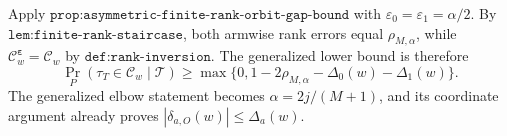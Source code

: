 Apply \(\texttt{prop:asymmetric-finite-rank-orbit-gap-bound}\) with \(\varepsilon_0=\varepsilon_1=\alpha/2\). By \(\texttt{lem:finite-rank-staircase}\), both armwise rank errors equal \(\rho_{M,\alpha}\), while \(\mathcal C^{\boldsymbol\varepsilon}_w=\mathcal C_w\) by \(\texttt{def:rank-inversion}\). The generalized lower bound is therefore
\[
\Pr_P(\tau_T\in\mathcal C_w\mid\mathcal T)
\ge\max\{0,1-2\rho_{M,\alpha}-\Delta_0(w)-\Delta_1(w)\}.
\]
The generalized elbow statement becomes \(\alpha=2j/(M+1)\), and its coordinate argument already proves \(|\delta_{a,O}(w)|\le\Delta_a(w)\).